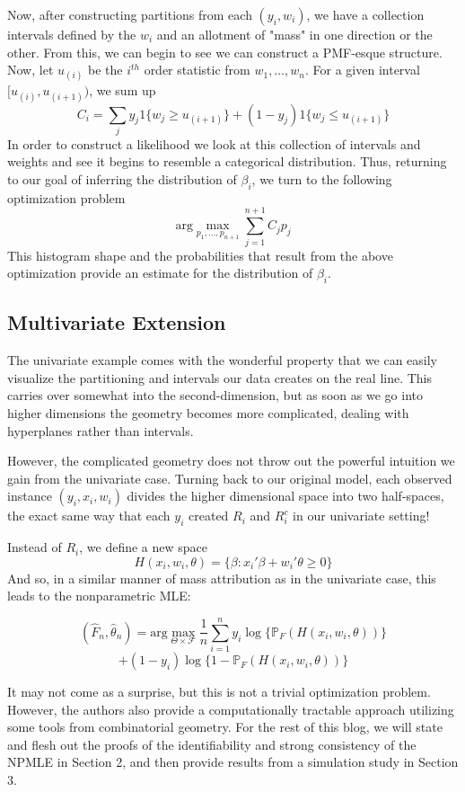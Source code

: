 \documentclass[11pt]{article}
\begin{document}
Now, after constructing partitions from each $(y_i,w_i)$, we have a collection intervals defined by the $w_i$ and an allotment of "mass" in one direction or the other. From this, we can begin to see we can construct a PMF-esque structure. Now, let $u_{(i)}$ be the $i^{th}$ order statistic from $w_1,\dots,w_n$. For a given interval $[u_{(i)},u_{(i+1)})$, we sum up
\[
C_i=\sum_j y_j1\{w_j\geq u_{(i+1)}\} + (1-y_j)1\{w_j\leq u_{(i+1)}\} 
\]
In order to construct a likelihood we look at this collection of intervals and weights and see it begins to resemble a categorical distribution. Thus, returning to our goal of inferring the distribution of $\beta_i$, we turn to the following optimization problem
\[
\text{arg}\max_{p_1,\dots,p_{n+1}} \sum_{j=1}^{n+1} C_jp_j
\]
This histogram shape and the probabilities that result from the above optimization provide an estimate for the distribution of $\beta_i$.

\subsection{Multivariate Extension}

\indent

The univariate example comes with the wonderful property that we can easily visualize the partitioning and intervals our data creates on the real line. This carries over somewhat into the second-dimension, but as soon as we go into higher dimensions the geometry becomes more complicated, dealing with hyperplanes rather than intervals. 

However, the complicated geometry does not throw out the powerful intuition we gain from the univariate case. Turning back to our original model, each observed instance $(y_i,x_i,w_i)$ divides the higher dimensional space into two half-spaces, the exact same way that each $y_i$ created $R_i$ and $R_i^c$ in our univariate setting!

Instead of $R_i$, we define a new space
\[
H(x_i,w_i,\theta)=\{\beta:x_i'\beta+w_i'\theta\geq0\}
\]
And so, in a similar manner of mass attribution as in the univariate case, this leads to the nonparametric MLE:

\[
(\hat F_n,\hat\theta_n)=\text{arg}\max_{\Theta\times\mathcal{F}} \frac{1}{n}\sum_{i=1}^ny_i\log\{\mathbb P_F(H(x_i,w_i,\theta))\}
\]
\[
+(1-y_i)\log\{1-\mathbb P_F(H(x_i,w_i,\theta))\}
\]

It may not come as a surprise, but this is not a trivial optimization problem. However, the authors also provide a computationally tractable approach utilizing some tools from combinatorial geometry. For the rest of this blog, we will state and flesh out the proofs of the identifiability and strong consistency of the NPMLE in Section 2, and then provide results from a simulation study in Section 3.
\end{document}
